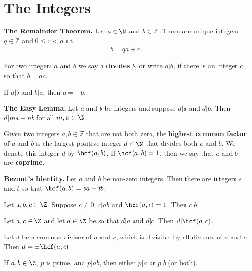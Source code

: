 \documentclass{article}
\begin{document}
\section{The Integers}
\begin{theorem}
    \textbf{The Remainder Theorem.} Let $a\in\N$ and $b\in\mathbb{Z}$.
    There are unique integers $q\in\mathbb{Z}$ and $0\leq r<a$ s.t.
    \begin{align*}
        b=qa+r.
    \end{align*}
\end{theorem}
\begin{definition}
    For two integers $a$ and $b$ we say $a$ \textbf{divides} $b$, or write $a|b$, if there is an integer $c$ so that $b=ac$.
\end{definition}
\begin{lemma}
    If $a|b$ and $b|a$, then $a=\pm b$.
\end{lemma}
\begin{lemma}
    \textbf{The Easy Lemma.} Let $a$ and $b$ be integers and suppose $d|a$ and $d|b$. Then $d|ma+nb$ for all $m,n\in\N$.
\end{lemma}
\begin{definition}
    Given two integers $a,b\in\mathbb{Z}$ that are not both zero, the \textbf{highest common factor} of $a$ and $b$ is the largest positive integer $d\in\N$ that divides both $a$ and $b$.
    We denote this integer $d$ by $\hcf(a,b)$. If $\hcf(a,b)=1$, then we say that $a$ and $b$ are \textbf{coprime}.
\end{definition}
\begin{theorem}
    \textbf{Bezout's Identity.} Let $a$ and $b$ be non-zero integers. Then there are integers $s$ and $t$ so that $\hcf(a,b)=sa+tb$.
\end{theorem}
\begin{corollary}
    Let $a,b,c\in\Z$. Suppose $c\not=0$, $c|ab$ and $\hcf(a,c)=1$. Then $c|b$.
\end{corollary}
\begin{corollary}
    Let $a,c\in\Z$ and let $d\in\Z$ be so that $d|a$ and $d|c$. Then $d|\hcf(a,c)$.
\end{corollary}
\begin{corollary}
    Let $d$ be a common divisor of $a$ and $c$, which is divisible by all divisors of $a$ and $c$. Then $d=\pm\hcf(a,c)$.
\end{corollary}
\begin{corollary}
    If $a,b\in\Z$, $p$ is prime, and $p|ab$, then either $p|a$ or $p|b$ (or both).
\end{corollary}
\end{document}
